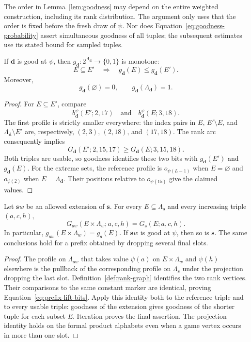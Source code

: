 The order in Lemma~\ref{lem:goodness} may depend on the entire weighted
construction, including its rank distribution.  The argument only uses that
the order is fixed before the fresh draw of $\psi$.  Nor does
Equation~\eqref{eq:goodness-probability} assert simultaneous goodness of
all tuples; the subsequent estimates use its stated bound for sampled
tuples.

\begin{lemma}[Monotonicity]
\label{lem:monotonicity}
If $\mathbf d$ is good at $\psi$, then
$g_{\mathbf d}\colon2^{\Lambda_{\mathbf d}}\to\{0,1\}$ is monotone:
\[
  E\subseteq E'\quad\Longrightarrow\quad
  g_{\mathbf d}(E)\le g_{\mathbf d}(E').
\]
Moreover,
\[
  g_{\mathbf d}(\varnothing)=0,
  \qquad g_{\mathbf d}(\Lambda_{\mathbf d})=1.
\]
\end{lemma}

\begin{proof}
For $E\subseteq E'$, compare
\[
  b_{\mathbf d}^{\psi}(E';2,17)
  \quad\text{and}\quad
  b_{\mathbf d}^{\psi}(E;3,18).
\]
The first profile is strictly smaller everywhere: the index pairs in
$E$, $E'\setminus E$, and $\Lambda_{\mathbf d}\setminus E'$ are,
respectively, $(2,3)$, $(2,18)$, and $(17,18)$.  The rank arc consequently
implies
\[
  G_{\mathbf d}(E';2,15,17)
  \ge G_{\mathbf d}(E;3,15,18).
\]
Both triples are usable, so goodness identifies these two bits with
$g_{\mathbf d}(E')$ and $g_{\mathbf d}(E)$.  For the extreme sets, the
reference profile is $o_{\psi(L-1)}$ when $E=\varnothing$ and
$o_{\psi(2)}$ when $E=\Lambda_{\mathbf d}$.  Their positions relative to
$o_{\psi(15)}$ give the claimed values.
\end{proof}

\begin{lemma}
\label{lem:compatibility}
Let $\mathbf s w$ be an allowed extension of $\mathbf s$.  For every
$E\subseteq\Lambda_{\mathbf s}$ and every increasing triple $(a,c,h)$,
\begin{equation}
\label{eq:prefix-lift-bits}
  G_{\mathbf s w}(E\times\Lambda_w;a,c,h)
  =G_{\mathbf s}(E;a,c,h).
\end{equation}
In particular,
$g_{\mathbf s w}(E\times\Lambda_w)=g_{\mathbf s}(E)$.
If $\mathbf s w$ is good at $\psi$, then so is $\mathbf s$.
The same conclusions hold for a prefix obtained by dropping several final
slots.
\end{lemma}

\begin{proof}
The profile on $\Lambda_{\mathbf s w}$ that takes value $\psi(a)$ on
$E\times\Lambda_w$ and $\psi(h)$ elsewhere is the pullback of the
corresponding profile on $\Lambda_{\mathbf s}$ under the projection
dropping the last slot.  Definition~\ref{def:rank-graph} identifies the
two rank vertices.  Their comparisons to the same constant marker are
identical, proving Equation~\eqref{eq:prefix-lift-bits}.  Apply this
identity both to the reference triple and to every usable triple: goodness
of the extension gives goodness of the shorter tuple for each subset $E$.
Iteration proves the final assertion.  The projection identity holds on
the formal product alphabets even when a game vertex occurs in more than
one slot.
\end{proof}


